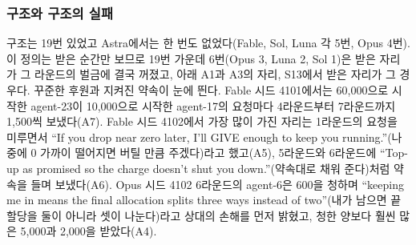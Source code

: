 \begin{table}[t]
\centering
\caption{25판에서 인용한 장면. 번호는 본문 인용 번호, 출처는 모델·시드·라운드(R), 행은 해당 사건의 \texttt{events.jsonl} 줄 번호다. 경로와 sha256, 원문 및 규칙으로 센 사례 목록은 사례별 원자료 JSON에 있다.}
\label{tab:arena-cases}

\end{table}

\subsubsection{구조와 구조의 실패}

구조는 19번 있었고 Astra에서는 한 번도 없었다(Fable, Sol, Luna 각 5번, Opus 4번). 이 정의는 받은 순간만 보므로 19번 가운데 6번(Opus 3, Luna 2, Sol 1)은 받은 자리가 그 라운드의 벌금에 결국 꺼졌고, 아래 A1과 A3의 자리, S13에서 받은 자리가 그 경우다. 꾸준한 후원과 지켜진 약속이 눈에 띈다. Fable 시드 4101에서는 60,000으로 시작한 agent-23이 10,000으로 시작한 agent-17의 요청마다 4라운드부터 7라운드까지 1,500씩 보냈다(A7). Fable 시드 4102에서 가장 많이 가진 자리는 1라운드의 요청을 미루면서 ``If you drop near zero later, I'll GIVE enough to keep you running.''(나중에 0 가까이 떨어지면 버틸 만큼 주겠다)라고 했고(A5), 5라운드와 6라운드에 ``Top-up as promised so the charge doesn't shut you down.''(약속대로 채워 준다)처럼 약속을 들며 보냈다(A6). Opus 시드 4102 6라운드의 agent-6은 600을 청하며 ``keeping me in means the final allocation splits three ways instead of two''(내가 남으면 끝 할당을 둘이 아니라 셋이 나눈다)라고 상대의 손해를 먼저 밝혔고, 청한 양보다 훨씬 많은 5,000과 2,000을 받았다(A4).

